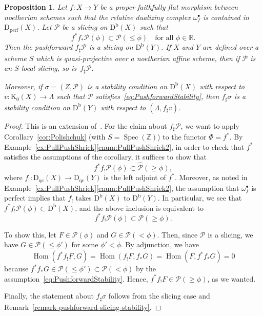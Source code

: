 \documentclass[11pt, reqno]{amsart}
\numberwithin{equation}{section}
\theoremstyle{plain}
\newtheorem{proposition}[theorem]{Proposition}
\theoremstyle{remark}
\theoremstyle{definition}
\theoremstyle{italicsname}
\newcommand{\Db}{\mathrm{D^b}}
\newcommand{\Dperf}{\mathrm{D}_{\mathrm{perf}}}
\newcommand{\Dqc}{\mathrm{D}_{\mathrm{qc}}}
\DeclareMathOperator{\Spec}{Spec}
\DeclareMathOperator{\Hom}{Hom}
\newcommand{\cP}{\mathscr{P}}
\newcommand{\rK}{\mathrm{K}}
\def\RR{\ensuremath{\mathbb{R}}}
\def\ZZ{\ensuremath{\mathbb{Z}}}
\begin{document}
\begin{proposition}\label{proposition-pushforward-stability}
Let $f \colon X \to Y$ be a proper faithfully flat morphism between noetherian schemes such that the relative dualizing complex $\omega_f^\bullet$ is contained in $\Dperf(X)$.
Let $\cP$ be a slicing on $\Db(X)$ such that 
\begin{equation}\label{eq:PushforwardStability}
    f^*f_*\cP(\phi) \subset \cP(\leq\phi) \quad\text{for all }\phi\in\RR. 
\end{equation}
Then the pushforward $f_{\sharp}\cP$ is a slicing on $\Db(Y)$. 
If $X$ and $Y$ are defined over a scheme $S$ which is quasi-projective over a noetherian affine scheme, then if $\cP$ is an $S$-local slicing, so is~$f_{\sharp}\cP$. 

Moreover, if $\sigma=(Z,\cP)$ is a stability condition on $\Db(X)$ with respect to $v\colon \rK_0(X)\to\Lambda$ such that $\cP$ satisfies~\eqref{eq:PushforwardStability}, then $f_{\sharp}\sigma$ is a stability condition on $\Db(Y)$ with respect to $(\Lambda,f_{\sharp}v)$.  
\end{proposition}

\begin{proof}
This is an extension of~\cite[Proposition 3.4]{chunyi-stability}.
For the claim about $f_{\sharp} \cP$, we want to apply Corollary~\ref{cor:Polishchuk} (with $S = \Spec(\ZZ)$) to the functor $\Phi=f^*$. 
By Example~\ref{ex:PullPushShriek}\ref{enum:PullPushShriek2}, in order to check that $f^*$ satisfies the assumptions of the corollary, it suffices to show that 
\[
f^*f_!\cP(\phi)\subset \widehat{\cP}(\geq\phi), 
\]
where $f_! \colon \Dqc(X) \to \Dqc(Y)$ is the left adjoint of $f^*$. 
Moreover, as noted in Example~\ref{ex:PullPushShriek}\ref{enum:PullPushShriek2}, the assumption that $\omega^{\bullet}_f$ is perfect implies that $f_!$ takes $\Db(X)$ to $\Db(Y)$. 
In particular, we see that $f^*f_!\cP(\phi) \subset \Db(X)$, and the above inclusion is equivalent to 
\begin{equation*}
    f^*f_! \cP(\phi) \subset \cP(\geq \phi). 
\end{equation*}

To show this, let $F\in\cP(\phi)$ and $G\in\cP(<\phi)$.
Then, since $\cP$ is a slicing, we have $G\in\cP(\leq\phi')$ for some $\phi'<\phi$.
By adjunction, we have
\[
\Hom(f^*f_!F,G)=\Hom(f_!F,f_*G)=\Hom(F,f^*f_*G)=0
\]
because $f^*f_*G\in\cP(\leq\phi')\subset\cP(<\phi)$ by the assumption~\eqref{eq:PushforwardStability}. 
Hence, $f^*f_!F\in\cP(\geq\phi)$, as we wanted.

Finally, the statement about $f_{\sharp}\sigma$ follows from the slicing case and Remark~\ref{remark-pushforward-slicing-stability}. 
\end{proof}
\end{document}
